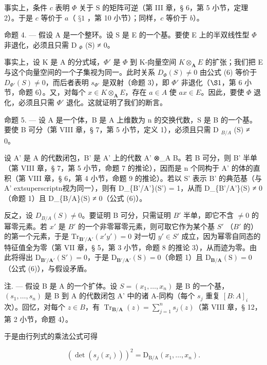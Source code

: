 事实上，条件 \(c\) 表明 \(\Phi\) 关于 S 的矩阵可逆（第 III 章，§ 6，第 5 小节，定理 2）。于是 \(c\) 等价于 \(a\)（ \(§ 1\) ，第 10 小节）；同样，\(c\) 等价于 \(b\)）。

命题 4. --- 假设 A 是一个整环。设 S 是 E 的一个基。要使 E 上的半双线性型 \(\Phi\) 非退化，必须且只需 D \(_{\Phi}\) (S) ≠ 0。

事实上，设 K 是 A 的分式域，\(\Phi'\) 是 \(\Phi\) 到 K-向量空间 \(K\otimes_{\mathbf{A}}E\) 的扩张；我们把 E 与这个向量空间的一个子集视为同一。此时关系 \(D_{\Phi}(S)\neq0\) 由公式 (6) 等价于 \(D_{\Phi'}(S)\neq0\)，而后者表明 \(s_{\Phi'}\) 是双射（命题 3），即 \(\Phi'\) 非退化（\(\S1\)，第 6 小节，命题 6）。又，对每个 \(x\in K\otimes_{\mathbf{A}}E\)，存在 \(a\in A\) 使 \(ax\in E\)。因此，要使 \(\Phi\) 退化，必须且只需 \(\Phi'\) 退化。这就证明了我们的断言。

命题 5. --- 设 A 是一个体，B 是 A 上维数为 n 的交换代数，S 是 B 的一个基。要使 B 可分（第 VIII 章，§ 7，第 5 小节，定义 1），必须且只需 D \(_{B/A}\) (S) ≠ 0。

设 A' 是 A 的代数闭包，B' 是 A' 上的代数 A' ⊗\_A B。若 B 可分，则 B' 半单（第 VIII 章，§ 7，第 5 小节，命题 7 的推论），因而是 n 个同构于 A' 的体的直积（第 VIII 章，§ 6，第 4 小节，命题 9 的推论）。若以 S' 表示 B' 的典范基（与 A'	extsuperscript{n}视为同一），则有 D\_\{B'/A'\}(S') = 1，从而 D\_\{B'/A'\}(S) ≠ 0（命题 1）且 D\_\{B/A\}(S) ≠ 0（公式 (6)）。

反之，设 \(D_{B/A}(S) \neq 0\)。要证明 B 可分，只需证明 \(B'\) 半单，即它不含 \(\neq 0\) 的幂零元素。若 \(x'\) 是 \(B'\) 的一个非零幂零元素，则可取它作为某个基 \(S'\) （\(B'\) 的）的第一个元素，于是 \(\mathrm{Tr}_{\mathbf{B}'/\mathbf{A}'}(x'y') = 0\) 对一切 \(y' \in S'\) 成立，因为幂零自同态的特征值全为零（第 VII 章，§ 5，第 3 小节，命题 8 的推论 3），从而迹为零。由此将得出 \(\mathrm{D}_{\mathbf{B}'/\mathbf{A}'}(\mathrm{S}') = 0\)，于是 \(\mathrm{D}_{\mathbf{B}'/\mathbf{A}'}(\mathrm{S}) = 0\)（命题 1）且 \(\mathrm{D}_{\mathbf{B}/\mathbf{A}}(\mathrm{S}) = 0\)（公式 (6)），与假设矛盾。

注. --- 假设 B 是 A 的一个扩体。设 \(S = (x_{1}, \ldots, x_{n})\) 是 B 的一个基，\((s_{1}, \ldots, s_{n})\) 是 B 到 A 的代数闭包 A' 中的诸 A-同构（每个 \(s_{j}\) 重复 \([B : A]_{i}\) 次）。回忆，对每个 \(z \in B\)，有 \(\operatorname{Tr}_{\mathbf{B}/\mathbf{A}}(z) = \sum_{j=1}^{n} s_{j}(z)\)（第 VIII 章，§ 12，第 2 小节，命题 4）。

于是由行列式的乘法公式可得

\[
(\det (s _ {j} (x _ {i}))) ^ {2} = \mathrm{D} _ {\mathrm{B/A}} (x _ {1}, \dots , x _ {n}).\tag{7}
\]

